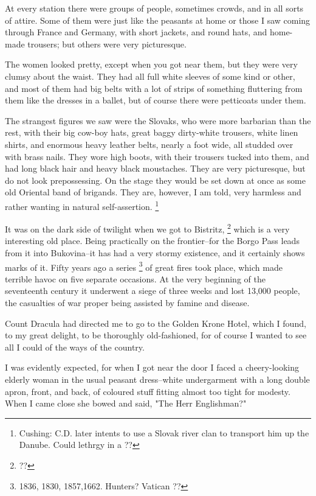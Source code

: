 At every station there were groups of people, sometimes crowds, and in all sorts of attire. Some of them were just like the peasants at home or those I saw coming through France and Germany, with short jackets, and round hats, and home-made trousers; but others were very picturesque. 

The women looked pretty, except when you got near them, but they were very clumsy about the waist. They had all full white sleeves of some kind or other, and most of them had big belts with a lot of strips of something fluttering from them like the dresses in a ballet, but of course there were petticoats under them. 

The strangest figures we saw were the Slovaks, who were more barbarian than the rest, with their big cow-boy hats, great baggy dirty-white trousers, white linen shirts, and enormous heavy leather belts, nearly a foot wide, all studded over with brass nails. They wore high boots, with their trousers tucked into them, and had long black hair and heavy black moustaches. They are very picturesque, but do not look prepossessing. On the stage they would be set down at once as some old Oriental band of brigands. They are, however, I am told, very harmless and rather wanting in natural self-assertion.
\footnote{Cushing: C.D. later intents to use a Slovak river clan to transport him up the Danube. Could lethrgy in a ??}

It was on the dark side of twilight when we got to Bistritz,
\footnote{??}
which is a very interesting old place. Being practically on the frontier--for the Borgo Pass leads from it into Bukovina--it has had a very stormy existence, and it certainly shows marks of it. Fifty years ago a series
\footnote{1836, 1830, 1857,1662. Hunters? Vatican ??}
of great fires took place, which made terrible havoc on five separate occasions. At the very beginning of the seventeenth century it underwent a siege of three weeks and lost 13,000 people, the casualties of war proper being assisted by famine and disease. 

Count Dracula had directed me to go to the Golden Krone Hotel, which I found, to my great delight, to be thoroughly old-fashioned, for of course I wanted to see all I could of the ways of the country. 

I was evidently expected, for when I got near the door I faced a cheery-looking elderly woman in the usual peasant dress--white undergarment with a long double apron, front, and back, of coloured stuff fitting almost too tight for modesty. When I came close she bowed and said, "The Herr Englishman?" 

